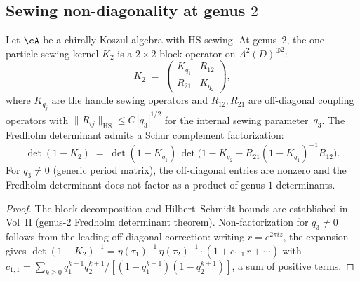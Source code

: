 \subsection{Sewing non-diagonality at genus $2$}%
\label{subsec:genus2-non-collapse}

\begin{proposition}%
\label{prop:genus2-non-diagonal}%
%
Let $\cA$ be a chirally Koszul algebra with HS-sewing.
At genus~$2$, the one-particle sewing kernel $K_2$ is a
$2 \times 2$ block operator on $A^2(D)^{\oplus 2}$:
\[
K_2
\;=\;
\begin{pmatrix}
K_{q_1} & R_{12} \\
R_{21} & K_{q_2}
\end{pmatrix},
\]
where $K_{q_j}$ are the handle sewing operators and
$R_{12}, R_{21}$ are off-diagonal coupling operators with
$\|R_{ij}\|_{\mathrm{HS}} \leq C\,|q_3|^{1/2}$ for the
internal sewing parameter~$q_3$. The Fredholm determinant
admits a Schur complement factorization:
\begin{equation}\label{eq:genus2-fredholm-schur}
\det(1 - K_2) \;=\; \det(1 - K_{q_1})\,
\det\bigl(1 - K_{q_2}
- R_{21}(1{-}K_{q_1})^{-1}R_{12}\bigr).
\end{equation}
For $q_3 \neq 0$ \textup{(}generic period matrix\textup{)},
the off-diagonal entries are nonzero and the Fredholm
determinant does not factor as a product of genus-$1$
determinants.
\end{proposition}

\begin{proof}
The block decomposition and Hilbert--Schmidt bounds are
established in Vol~II (genus-$2$ Fredholm determinant
theorem). Non-factorization for $q_3 \neq 0$ follows from
the leading off-diagonal correction: writing
$r = e^{2\pi i z}$, the expansion gives
$\det(1 - K_2)^{-1} = \eta(\tau_1)^{-1}\,\eta(\tau_2)^{-1}
\cdot (1 + c_{1,1}\,r + \cdots)$ with
$c_{1,1} = \sum_{k \geq 0}
q_1^{k+1}q_2^{k+1}/[(1{-}q_1^{k+1})(1{-}q_2^{k+1})]$,
a sum of positive terms.
\end{proof}

